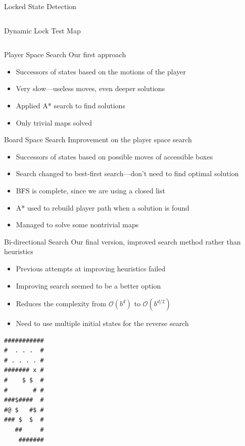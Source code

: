 \documentclass{beamer}
\begin{document}
\begin{frame}{Locked State Detection}
\begin{columns}
\begin{column}{.5\textwidth}
\begin{block}{Dynamic Lock Test Map}
      \end{block}
    \end{column}
  \end{columns}

\end{frame}

\begin{frame}{Player Space Search}
  Our first approach
  \begin{itemize}
  \item Successors of states based on the motions of the player
  \item Very slow---useless moves, even deeper solutions
  \item Applied A* search to find solutions
  \item Only trivial maps solved
  \end{itemize}
\end{frame}

\begin{frame}{Board Space Search}
  Improvement on the player space search
  \begin{itemize}
  \item Successors of states based on possible moves of accessible boxes
  \item Search changed to best-first search---don't need to find optimal solution
  \item BFS is complete, since we are using a closed list
  \item A* used to rebuild player path when a solution is found
  \item Managed to solve some nontrivial maps
  \end{itemize}
\end{frame}

\begin{frame}{Bi-directional Search}
  Our final version, improved search method rather than heuristics
  \begin{itemize}
  \item Previous attempts at improving heuristics failed
  \item Improving search seemed to be a better option
  \item Reduces the complexity from $\mathcal{O}(b^d)$ to $\mathcal{O}(b^{d/2})$
  \item Need to use multiple initial states for the reverse search
  \end{itemize}
\end{frame}

\begin{lrbox}{\mapff}
  \begin{minipage}{.25\textwidth}
\centering
\begin{BVerbatim}
###########
#  . . .  #
# . . . . #
####### x #
#    $ $  #
#       # #
###$####  #
#@ $   #$ #
### $  $  #
   ##     #
    #######  
\end{BVerbatim}
  \end{minipage}
\end{lrbox}%
\end{document}
